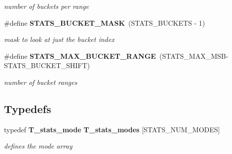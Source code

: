 \begin{CompactItemize}
\begin{CompactList}\small\item\em number of buckets per range\item\end{CompactList}\item 
{}
\#define {\bf STATS\_\-BUCKET\_\-MASK}\ (STATS\_\-BUCKETS - 1)\label{bucket__stats_8h_a5}

\begin{CompactList}\small\item\em mask to look at just the bucket index\item\end{CompactList}\item 
{}
\#define {\bf STATS\_\-MAX\_\-BUCKET\_\-RANGE}\ (STATS\_\-MAX\_\-MSB-STATS\_\-BUCKET\_\-SHIFT)\label{bucket__stats_8h_a6}

\begin{CompactList}\small\item\em number of bucket ranges\item\end{CompactList}\end{CompactItemize}
\subsection*{Typedefs}
\begin{CompactItemize}
\item 
{}
typedef {\bf T\_\-stats\_\-mode} {\bf T\_\-stats\_\-modes} [STATS\_\-NUM\_\-MODES]\label{bucket__stats_8h_a7}

\begin{CompactList}\small\item\em defines the mode array\item\end{CompactList}\end{CompactItemize}
